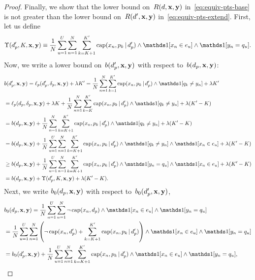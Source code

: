\begin{arxiv}
\begin{proof}
Finally, we show that the lower bound
on~${R({d}, \mathbf{x}, \mathbf{y})}$ in~\eqref{eq:equiv-pts-base} is not greater than
the lower bound on~${R({d}', \mathbf{x}, \mathbf{y})}$ in~\eqref{eq:equiv-pts-extend}.
%
First, let us define
\begin{align}
\Upsilon(\Prefix', K, \x, \y) \equiv \frac{1}{N} \sum_{u=1}^U \sum_{n=1}^N
    \sum_{k=K+1}^{K'} \Cap(x_n, p_k \given \Prefix') \wedge \one [ x_n \in e_u ] \wedge \one [ y_n = q_u ].
\end{align}
Now, we write a lower bound on~${b(d_p', \mathbf{x}, \mathbf{y})}$ with respect to~${b(d_p, \mathbf{x}, \mathbf{y})}$:
\begin{align}
&b(\Prefix', \x, \y) = \Loss_p(\Prefix', \Labels, \x, \y) + \Reg K'
= \frac{1}{N} \sum_{n=1}^N \sum_{k=1}^{K'} \Cap(x_n, p_k \given \Prefix') \wedge \one [ q_k \neq y_n ] + \Reg K' \nn \\
&= \Loss_p(\Prefix, \Labels, \x, \y) + \Reg K + \frac{1}{N} \sum_{n=1}^N \sum_{k=K}^{K'} \Cap(x_n, p_k \given \Prefix') \wedge \one [ q_k \neq y_n ] + \Reg (K' - K) \nn \\
&= b(\Prefix, \x, \y) + \frac{1}{N} \sum_{n=1}^N \sum_{k=K+1}^{K'} \Cap(x_n, p_k \given \Prefix') \wedge \one [ q_k \neq y_n ] + \Reg (K' - K) \nn \\
&= b(\Prefix, \x, \y) + \frac{1}{N} \sum_{u=1}^U \sum_{n=1}^N \sum_{k=K+1}^{K'} \Cap(x_n, p_k \given \Prefix')
  \wedge \one [ q_k \neq y_n ] \wedge \one [ x_n \in e_u ] + \Reg (K' - K) \nn \\
&\ge b(\Prefix, \x, \y) + \frac{1}{N} \sum_{u=1}^U \sum_{n=1}^N \sum_{k=K+1}^{K'} \Cap(x_n, p_k \given \Prefix')
  \wedge \one [ y_n = q_u ] \wedge \one [ x_n \in e_u ] + \Reg (K' - K) \nn \\
&= b(\Prefix, \x, \y) + \Upsilon(\Prefix', K, \x, \y) + \Reg (K' - K).
\label{eq:equiv-pts-b}
\end{align}
Next, we write ${b_0(d_p, \mathbf{x}, \mathbf{y})}$ with respect to~${b_0(d_p', \mathbf{x}, \mathbf{y})}$,
\begin{align}
&b_0(\Prefix, \x, \y) = \frac{1}{N} \sum_{u=1}^U \sum_{n=1}^N
    \neg\, \Cap(x_n, \Prefix) \wedge \one [ x_n \in e_u ] \wedge \one [ y_n = q_u ] \nn \\
&= \frac{1}{N} \sum_{u=1}^U \sum_{n=1}^N
    \left(\neg\, \Cap(x_n, \Prefix')+ \sum_{k=K+1}^{K'} \Cap(x_n, p_k \given \Prefix') \right)
    \wedge \one [ x_n \in e_u ] \wedge \one [ y_n = q_u ] \nn \\
&= b_0(\Prefix', \x, \y) + \frac{1}{N} \sum_{u=1}^U \sum_{n=1}^N
    \sum_{k=K+1}^{K'} \Cap(x_n, p_k \given \Prefix') \wedge \one [ x_n \in e_u ] \wedge \one [ y_n = q_u ],

\end{align}
\end{proof}
\end{arxiv}

